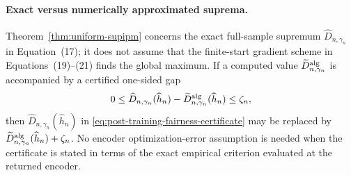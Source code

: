 \documentclass[10pt]{article}
\begin{document}
\paragraph{Exact versus numerically approximated suprema.}
Theorem~\ref{thm:uniform-supipm} concerns the exact full-sample supremum
\(\widehat D_{n,\gamma_n}\) in Equation~(17); it does not assume that the
finite-start gradient scheme in Equations~(19)--(21) finds the global
maximum.  If a computed value \(\widetilde D_{n,\gamma_n}^{\rm alg}\) is
accompanied by a certified one-sided gap
\[
  0\le
  \widehat D_{n,\gamma_n}(\widehat h_n)
  -\widetilde D_{n,\gamma_n}^{\rm alg}(\widehat h_n)
  \le\zeta_n,
\]
then \(\widehat D_{n,\gamma_n}(\widehat h_n)\) in
\eqref{eq:post-training-fairness-certificate} may be replaced by
\(\widetilde D_{n,\gamma_n}^{\rm alg}(\widehat h_n)+\zeta_n\).  No encoder
optimization-error assumption is needed when the certificate is stated in
terms of the exact empirical criterion evaluated at the returned encoder.
\end{document}
